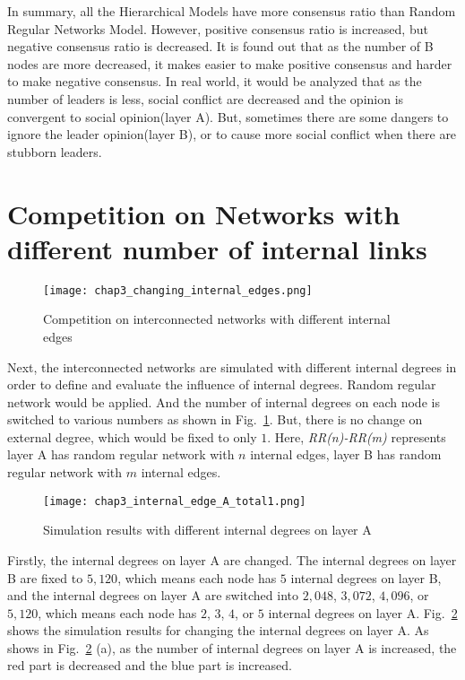 In summary, all the Hierarchical Models have more consensus ratio than Random Regular Networks Model. However, positive consensus ratio is increased, but negative consensus ratio is decreased. It is found out that as the number of B nodes are more decreased, it makes easier to make positive consensus and harder to make negative consensus. In real world, it would be analyzed that as the number of leaders is less, social conflict are decreased and the opinion is convergent to social opinion(layer A). But, sometimes there are some dangers to ignore the leader opinion(layer B), or to cause more social conflict when there are stubborn leaders. 


\section{Competition on Networks with different number of internal links}
\begin{figure}[!htb]
	\centering
	\texttt{[image: chap3\_changing\_internal\_edges.png]}
	\caption{Competition on interconnected networks with different internal edges}
	\label{chap3_changing_internal_edges}
\end{figure}
Next, the interconnected networks are simulated with different internal degrees in order to define and evaluate the influence of internal degrees. Random regular network would be applied. And the number of internal degrees on each node is switched to various numbers as shown in Fig.~\ref{chap3_changing_internal_edges}. But, there is no change on external degree, which would be fixed to only $1$. Here, \textit{RR(n)-RR(m)} represents layer A has random regular network with $n$ internal edges, layer B has random regular network with $m$ internal edges.
\begin{figure}[!htb]
	\centering
	\texttt{[image: chap3\_internal\_edge\_A\_total1.png]}
	\caption{Simulation results with different internal degrees on layer A}
	\label{chap3_internal_edge_A_total}
\end{figure}
Firstly, the internal degrees on layer A are changed. The internal degrees on layer B are fixed to $5,120$, which means each node has $5$ internal degrees on layer B, and the internal degrees on layer A are switched into $2,048$, $3,072$, $4,096$, or $5,120$, which means each node has $2$, $3$, $4$, or $5$ internal degrees on layer A. Fig.~\ref{chap3_internal_edge_A_total} shows the simulation results for changing the internal degrees on layer A. As shows in Fig.~\ref{chap3_internal_edge_A_total} (a), as the number of internal degrees on layer A is increased, the red part is decreased and the blue part is increased.  

